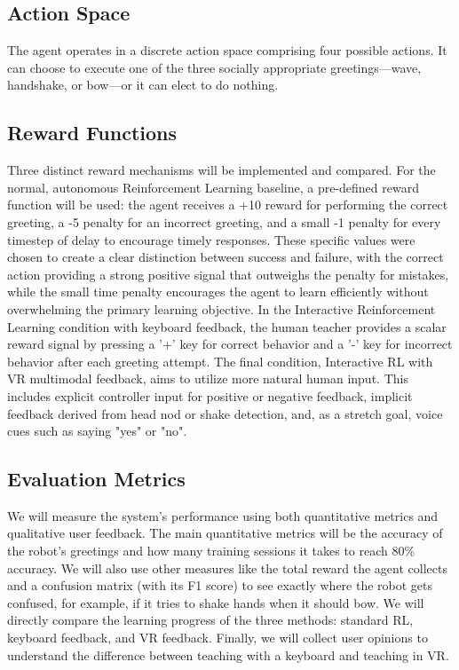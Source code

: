 \documentclass[rnd]{mas_proposal}
\begin{document}
\subsection{Action Space}
The agent operates in a discrete action space comprising four possible actions. It can choose to execute one of the three socially appropriate greetings—wave, handshake, or bow—or it can elect to do nothing.

\subsection{Reward Functions}
Three distinct reward mechanisms will be implemented and compared. For the normal, autonomous Reinforcement Learning baseline, a pre-defined reward function will be used: the agent receives a +10 reward for performing the correct greeting, a -5 penalty for an incorrect greeting, and a small -1 penalty for every timestep of delay to encourage timely responses. These specific values were chosen to create a clear distinction between success and failure, with the correct action providing a strong positive signal that outweighs the penalty for mistakes, while the small time penalty encourages the agent to learn efficiently without overwhelming the primary learning objective. In the Interactive Reinforcement Learning condition with keyboard feedback, the human teacher provides a scalar reward signal by pressing a '+' key for correct behavior and a '-' key for incorrect behavior after each greeting attempt. The final condition, Interactive RL with VR multimodal feedback, aims to utilize more natural human input. This includes explicit controller input for positive or negative feedback, implicit feedback derived from head nod or shake detection, and, as a stretch goal, voice cues such as saying "yes" or "no".

\subsection{Evaluation Metrics}
We will measure the system's performance using both quantitative metrics and qualitative user feedback. The main quantitative metrics will be the accuracy of the robot's greetings and how many training sessions it takes to reach 80\% accuracy. We will also use other measures like the total reward the agent collects and a confusion matrix (with its F1 score) to see exactly where the robot gets confused, for example, if it tries to shake hands when it should bow. We will directly compare the learning progress of the three methods: standard RL, keyboard feedback, and VR feedback. Finally, we will collect user opinions to understand the difference between teaching with a keyboard and teaching in VR.
\end{document}
